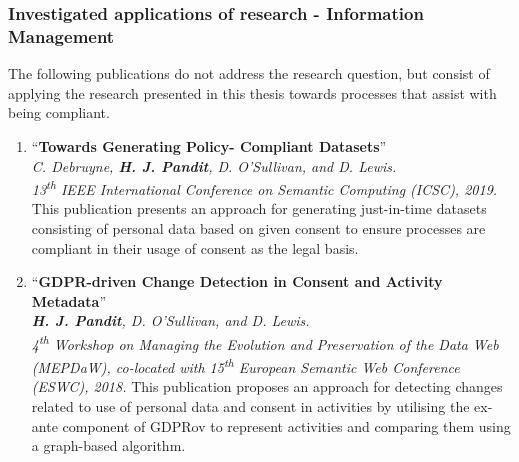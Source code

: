 \subsubsection{Investigated applications of research - Information Management}
The following publications do not address the research question, but consist of applying the research presented in this thesis towards processes that assist with being compliant.
\begin{enumerate}[resume]
    \item ``\textbf{Towards Generating Policy- Compliant Datasets}'' \cite{debruyne_towards_2019} \\
    \textit{C. Debruyne, \textbf{H. J. Pandit}, D. O’Sullivan, and D. Lewis.} \\ 
    \textit{13\textsuperscript{th} IEEE International Conference on Semantic Computing (ICSC), 2019.}
    \vspace{0.1cm} \newline This publication presents an approach for generating just-in-time datasets consisting of personal data based on given consent to ensure processes are compliant in their usage of consent as the legal basis.
    \item ``\textbf{GDPR-driven Change Detection in Consent and Activity Metadata}'' \cite{pandit_gdpr-driven_2018} \\
    \textit{\textbf{H. J. Pandit}, D. O’Sullivan, and D. Lewis.} \\ 
    \textit{4\textsuperscript{th} Workshop on Managing the Evolution and Preservation of the Data Web (MEPDaW), co-located with 15\textsuperscript{th} European Semantic Web Conference (ESWC), 2018.}
    \vspace{0.1cm} \newline This publication proposes an approach for detecting changes related to use of personal data and consent in activities by utilising the ex-ante component of GDPRov to represent activities and comparing them using a graph-based algorithm.
\end{enumerate}

